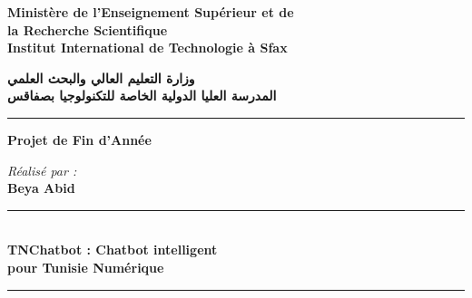 \documentclass[12pt,a4paper]{report}
\begin{document}
\dominitoc

\begin{titlepage}
  \begin{center}
    \noindent
    \begin{minipage}[t]{0.30\textwidth}
      \raggedright
      \footnotesize
      \textbf{Ministère de l'Enseignement Supérieur et de\\
      la Recherche Scientifique}\\[4pt]
      \textbf{Institut International de Technologie à Sfax}
    \end{minipage}
    \hfill
    \begin{minipage}[t]{0.25\textwidth}
      \centering
    \end{minipage}
    \hfill
    \begin{minipage}[t]{0.30\textwidth}
      \raggedleft
      \footnotesize
      \textbf{وزارة التعليم العالي والبحث العلمي}\\[4pt]
      \textbf{المدرسة العليا الدولية الخاصة للتكنولوجيا بصفاقس}
    \end{minipage}

    \vspace{0.5cm}
    \noindent\rule{\textwidth}{0.8pt}
    \vspace{1.5cm}

    {\Huge\bfseries Projet de Fin d'Année}

    \vspace{2cm}

    {\large\itshape Réalisé par :}\\[0.5cm]
    {\Large\bfseries Beya Abid}

    \vspace{2cm}
    \noindent\rule{0.6\textwidth}{0.6pt}\\[0.4cm]
    {\LARGE\bfseries TNChatbot : Chatbot intelligent\\[0.3cm]
    pour Tunisie Numérique}\\[0.4cm]
    \noindent\rule{0.6\textwidth}{0.6pt}


\end{center}
\end{titlepage}
\end{document}
